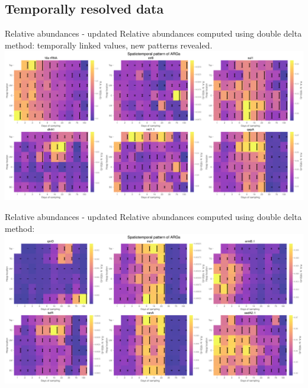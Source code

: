 \documentclass[mathserif,11pt]{beamer}
\begin{document}
\subsection{Temporally resolved data}
\begin{frame}{Relative abundances - updated}
Relative abundances computed using double delta method: temporally linked values, new patterns revealed.
	\includegraphics[width=\textwidth]{Figures/Sian_spatial_variation_first6_assays_with_errorbar_day0.png}
\end{frame}
\begin{frame}{Relative abundances - updated}
Relative abundances computed using double delta method:
	\includegraphics[width=\textwidth]{Figures/Sian_spatial_variation_second6_assays_with_errorbar_day0.png}
\end{frame}
\end{document}
